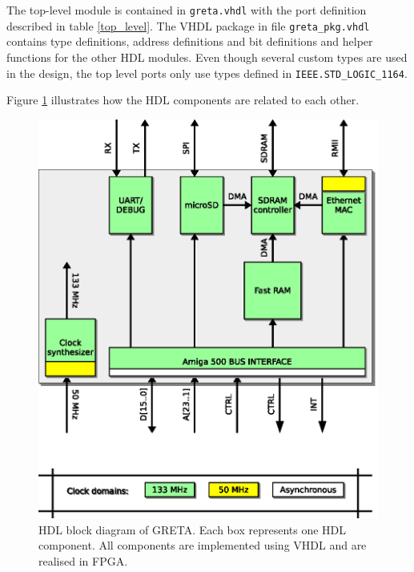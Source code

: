\documentclass[a4paper]{report}
\begin{document}
The top-level module is contained in \texttt{greta.vhdl}
with the port definition described in table \ref{top_level}.
The VHDL package in file \texttt{greta\_pkg.vhdl} contains
type definitions, address definitions and bit definitions and
helper functions for the other HDL modules. Even though several
custom types are used in the design, the top level ports only
use types defined in \texttt{IEEE.STD\_LOGIC\_1164}.

Figure \ref{hdl_overview} illustrates how the HDL
components are related to each other.

\begin{figure}
\centering
\includegraphics{hdl_overview.eps}
\caption{HDL block diagram of GRETA. Each box represents one
HDL component. All components are implemented using VHDL and
are realised in FPGA.}
\label{hdl_overview}
\end{figure}
\end{document}
